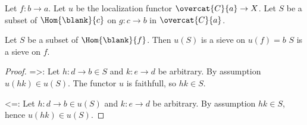 Let $f:b \rightarrow a$.
Let $u$ be the localization functor $\overcat{C}{a} \rightarrow X$.
Let $S$ be a subset of $\Hom{\blank}{c}$ 
on $g: c \rightarrow b$ in $\overcat{C}{a}$.

\begin{lemma}
Let $S$ be a subset of $\Hom{\blank}{f}$.
Then $u(S)$ is a sieve on $u(f) = b$ \iff $S$ is a sieve on $f$.
\end{lemma}

\begin{proof}
=>:
Let $h: d \rightarrow b \in S$ 
and $k: e \rightarrow d$ be arbitrary.
By assumption $u(hk)\in u(S)$.
The functor $u$ is faithfull, so $hk \in S$.

<=:
Let $h: d \rightarrow b \in u(S)$ 
and $k: e \rightarrow d$ be arbitrary.
By assumption $hk \in S$, hence $u(hk) \in u(S)$.
\end{proof}